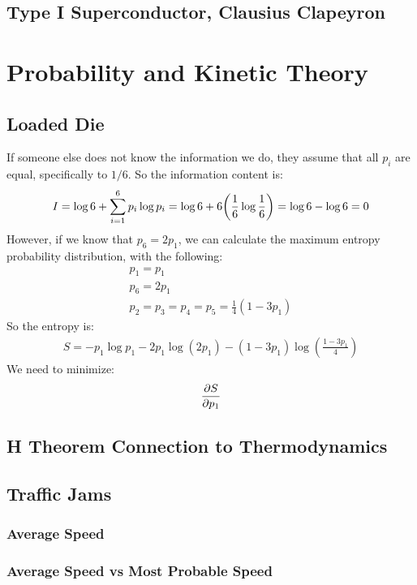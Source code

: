 \documentclass[12pt]{article}
\begin{document}
\subsection{Type I Superconductor, Clausius Clapeyron}

\section{Probability and Kinetic Theory}
\subsection{Loaded Die}
If someone else does not know the information we do, they assume that all $p_i$ are equal, specifically to $1/6$. So the information content is:
\begin{align*}
  I=\log 6+\sum_{i=1}^6p_i\log p_i=\log 6+6\qty(\frac16\log\frac16)=
  \log6-\log6=0
\end{align*}
However, if we know that $p_6=2p_1$, we can calculate the maximum entropy probability distribution, with the following:
\begin{gather*}
  p_1=p_1\\
  p_6=2p_1\\
  p_2=p_3=p_4=p_5=\frac14(1-3p_1)
\end{gather*}
So the entropy is:
\begin{align*}
  S=-p_1\log p_1-2p_1\log(2p_1)-(1-3p_1)\log(\frac{1-3p_1}{4})
\end{align*}
We need to minimize:
\begin{align*}
  \pdv{S}{p_1}
\end{align*}
\subsection{H Theorem Connection to Thermodynamics}

\subsection{Traffic Jams}

\subsubsection{Average Speed}

\subsubsection{Average Speed vs Most Probable Speed}
\end{document}
